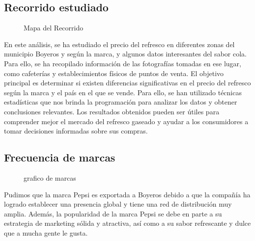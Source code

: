 \documentclass[]{article}
\begin{document}
\subsection{Recorrido estudiado}
 \begin{figure}[h]
	\caption{Mapa del Recorrido}
	\label{fig:logo}

\end{figure}
En este análisis, se ha estudiado el precio del refresco en diferentes zonas del municipio Boyeros y según la marca, y algunos datos interesantes del sabor cola. Para ello, se ha recopilado información de las fotografías tomadas en ese lugar, como cafeterías y establecimientos físicos de puntos de venta. El objetivo principal es determinar si existen diferencias significativas en el precio del refresco según la marca y el país en el que se vende. Para ello, se han utilizado técnicas estadísticas que nos brinda la programación para analizar los datos y obtener conclusiones relevantes. Los resultados obtenidos pueden ser útiles para comprender mejor el mercado del refresco gaseado y ayudar a los consumidores a tomar decisiones informadas sobre sus compras.
\subsection{Frecuencia de marcas}\label{sub:center}
 \begin{figure}[h]
	\caption{grafico de marcas}
	\label{fig:logo}
\end{figure}
Pudimos que la marca Pepsi es exportada a Boyeros debido a que la compañía ha logrado establecer una presencia global y tiene una red de distribución muy amplia. Además, la popularidad de la marca Pepsi se debe en parte a su estrategia de marketing sólida y atractiva, así como a su sabor refrescante y dulce que a mucha gente le gusta. 
\end{document}
